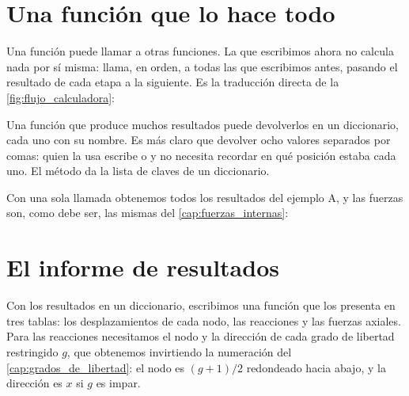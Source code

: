 \section{Una función que lo hace todo}\label{sec:analizar}

Una función puede llamar a otras funciones. La que escribimos ahora no
calcula nada por sí misma: llama, en orden, a todas las que escribimos antes,
pasando el resultado de cada etapa a la siguiente. Es la traducción directa
de la \cref{fig:flujo_calculadora}:

\begin{python}
Una función que produce muchos resultados puede devolverlos en un
diccionario, cada uno con su nombre. Es más claro que devolver ocho valores
separados por comas: quien la usa escribe  o
 y no necesita recordar en qué posición estaba cada uno.
El método  da la lista de claves de un diccionario.
\end{python}

Con una sola llamada obtenemos todos los resultados del ejemplo A, y las
fuerzas son, como debe ser, las mismas del \cref{cap:fuerzas_internas}:

\section{El informe de resultados}\label{sec:informe}

Con los resultados en un diccionario, escribimos una función que los presenta
en tres tablas: los desplazamientos de cada nodo, las reacciones y las fuerzas
axiales. Para las reacciones necesitamos el nodo y la dirección de cada grado
de libertad restringido $g$, que obtenemos invirtiendo la numeración del
\cref{cap:grados_de_libertad}: el nodo es $(g + 1) / 2$ redondeado hacia
abajo, y la dirección es $x$ si $g$ es impar.


